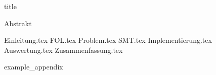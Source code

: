 \documentclass{article}
\begin{document}
    {title}

    \frontmatter

    {Abstrakt}
    \newpage

    \tableofcontents


    \mainmatter

    {Einleitung.tex}
    {FOL.tex}
    {Problem.tex}
    {SMT.tex}
    {Implementierung.tex}
    {Auswertung.tex}
    {Zusammenfassung.tex}

    \newpage
    \printbibliography[heading = bibintoc, title = Literatur]    %

    \addappendix
    {example_appendix}
    \newpage

\end{document}
